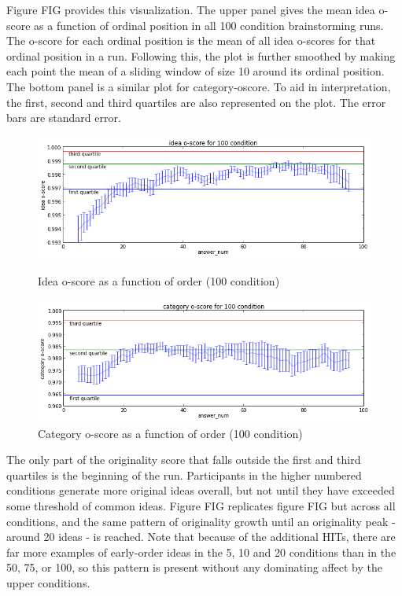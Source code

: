 Figure FIG provides this visualization. The upper panel gives the mean idea o-score as a function of ordinal position in all 100 condition brainstorming runs. The o-score for each ordinal position is the mean of all idea o-scores for that ordinal position in a run. Following this, the plot is further smoothed by making each point the mean of a sliding window of size 10 around its ordinal position. The bottom panel is a similar plot for category-oscore. To aid in interpretation, the first, second and third quartiles are also represented on the plot. The error bars are standard error.

\begin{figure}[h]
    \centering
    \includegraphics[width=0.9\columnwidth]{idea_oscore_order_100}
    \caption{Idea o-score as a function of order (100 condition)}
    \includegraphics[width=0.9\columnwidth]{cat_oscore_order_100}
    \caption{Category o-score as a function of order (100 condition)}
\end{figure}

The only part of the originality score that falls outside the first and third quartiles is the beginning of the run. Participants in the higher numbered conditions generate more original ideas overall, but not until they have exceeded some threshold of common ideas. Figure FIG replicates figure FIG but across all conditions, and the same pattern of originality growth until an originality peak - around 20 ideas - is reached. Note that because of the additional HITs, there are far more examples of early-order ideas in the 5, 10 and 20 conditions than in the 50, 75, or 100, so this pattern is present without any dominating affect by the upper conditions.

